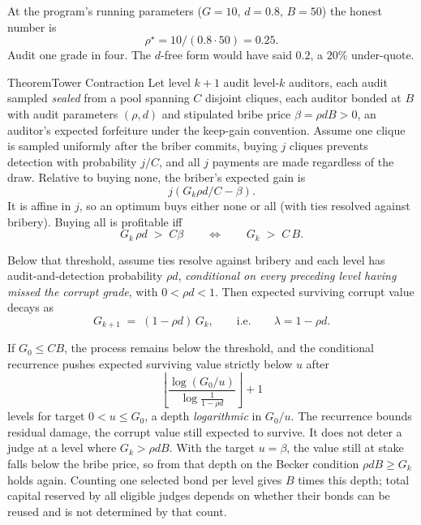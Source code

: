 \documentclass[11pt,a4paper]{article}
\theoremstyle{definition}
\begin{document}
At the program's running parameters ($G=10$, $d=0.8$, $B=50$) the honest number is
\[
  \rho^\star = 10/(0.8\cdot 50) = 0.25.
\]
Audit one grade in four. The $d$-free form would have said $0.2$, a $20\%$
under-quote.

\begin{pdclaim}{Theorem}{Tower Contraction}
\setlength{\parskip}{4pt plus 1pt}
\label{thm:tower-imported}
Let level $k{+}1$ audit level-$k$ auditors, each audit sampled
\emph{sealed} from a pool spanning $C$ disjoint cliques, each auditor bonded at $B$
with audit parameters $(\rho,d)$ and stipulated bribe price
$\beta=\rho d B>0$, an auditor's expected forfeiture under the keep-gain
convention. Assume one clique is sampled uniformly after the briber
commits, buying $j$ cliques prevents detection with probability $j/C$, and
all $j$ payments are made regardless of the draw. Relative to buying none,
the briber's expected gain is
\[j\left(G_k\rho d/C-\beta\right).\]
It is affine in $j$, so an optimum buys either none or all (with ties
resolved against bribery). Buying all is profitable iff
\[
  G_k\,\rho d \;>\; C\beta
  \qquad\Longleftrightarrow\qquad
  G_k \;>\; C\,B .
\]

Below that threshold, assume ties resolve against bribery and each level has
audit-and-detection probability $\rho d$, \emph{conditional on every preceding
level having missed the corrupt grade}, with $0<\rho d<1$. Then expected
surviving corrupt value decays as
\[
  G_{k+1} \;=\; (1-\rho d)\,G_k ,
  \qquad\text{i.e.}\qquad \lambda = 1-\rho d .
\]

If $G_0\le CB$, the process remains below the threshold, and the
conditional recurrence pushes expected surviving value strictly below $u$ after
\[
  \left\lfloor \frac{\log(G_0/u)}{\log\tfrac{1}{1-\rho d}}\right\rfloor+1
\]
levels for target
$0<u\le G_0$, a depth
\emph{logarithmic} in $G_0/u$. The recurrence bounds residual damage, the
corrupt value still expected to survive. It does not deter a judge at a
level where $G_k>\rho dB$. With the target $u=\beta$, the value still at
stake falls below the bribe price, so from that depth on the Becker
condition $\rho dB\ge G_k$ holds again. Counting one selected bond per level gives
$B$ times this depth; total capital reserved by all eligible judges depends
on whether their bonds can be reused and is not determined by that count.
\end{pdclaim}
\end{document}
